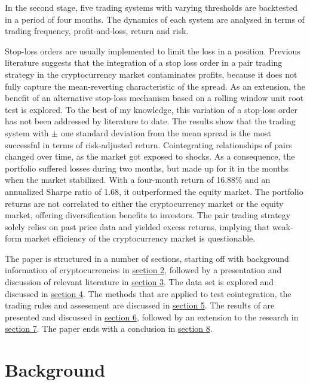 \documentclass[12pt,english,authoryear]{article}
\begin{document}
In the second stage, five trading systems with varying thresholds are backtested in a period of four months. The dynamics of each system are analysed in terms of trading frequency, profit-and-loss, return and risk. 

Stop-loss orders are usually implemented to limit the loss in a position. Previous literature suggests that the integration of a stop loss order in a pair trading strategy in the cryptocurrency market contaminates profits, because it does not fully capture the mean-reverting characteristic of the spread. As an extension, the benefit of an alternative stop-loss mechanism based on a rolling window unit root test is explored. To the best of my knowledge, this variation of a stop-loss order has not been addressed by literature to date.  
The results show that the trading system with $\pm$ one standard deviation from the mean spread is the most successful in terms of risk-adjusted return. Cointegrating relationships of pairs changed over time, as the market got exposed to shocks. As a consequence, the portfolio suffered losses during two months, but made up for it in the months when the market stabilized. With a four-month return of 16.88\% and an annualized Sharpe ratio of 1.68, it outperformed the equity market. The portfolio returns are not correlated to either the cryptocurrency market or the equity market, offering diversification benefits to investors. The pair trading strategy solely relies on past price data and yielded excess returns, implying that weak-form market efficiency of the cryptocurrency market is questionable. 

The paper is structured in a number of sections, starting off with background information of cryptocurrencies in \hyperref[sec:Background]{section 2}, followed by a presentation and discussion of relevant literature in \hyperref[sec:Literature]{section 3}. The data set is explored and discussed in \hyperref[sec:Data]{section 4}. The methods that are applied to test cointegration, the trading rules and assessment are discussed in \hyperref[Method]{section 5}. The results of are presented and discussed in \hyperref[sec:Results]{section 6}, followed by an extension to the research in \hyperref[sec:Extension]{section 7}. The paper ends with a conclusion in \hyperref[sec:Conclusion]{section 8}. 

\section{Background} \label{sec:Background}
\end{document}

